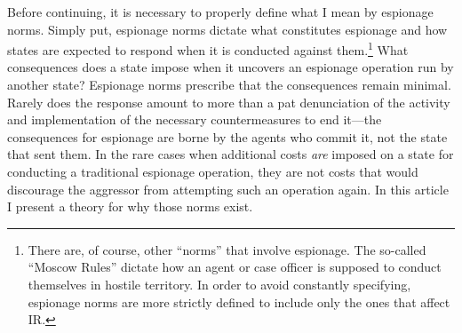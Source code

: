 \documentclass[14pt]{extarticle}
\begin{document}
Before continuing, it is necessary to properly define what I mean by espionage norms. Simply put, espionage norms dictate what constitutes espionage and how states are expected to respond when it is conducted against them.\footnote{There are, of course, other \enquote{norms} that involve espionage. The so-called \enquote{Moscow Rules} dictate how an agent or case officer is supposed to conduct themselves in hostile territory. In order to avoid constantly specifying, espionage norms are more strictly defined to include only the ones that affect IR.} What consequences does a state impose when it uncovers an espionage operation run by another state? Espionage norms prescribe that the consequences remain minimal. Rarely does the response amount to more than a pat denunciation of the activity and implementation of the necessary countermeasures to end it---the consequences for espionage are borne by the agents who commit it, not the state that sent them. In the rare cases when additional costs \emph{are} imposed on a state for conducting a traditional espionage operation, they are not costs that would discourage the aggressor from attempting such an operation again. In this article I present a theory for why those norms exist.
\end{document}
